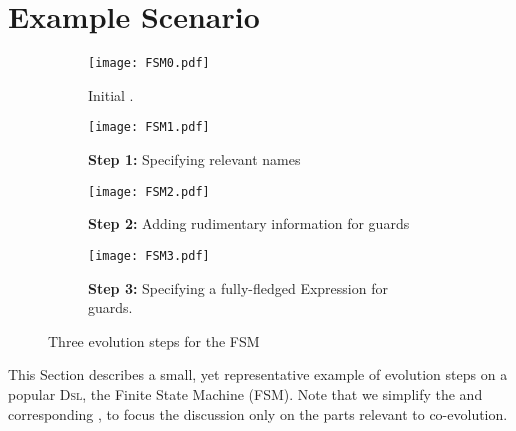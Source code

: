\section{Example Scenario}
\label{sec:Example}

\begin{figure*}
    \centering
    \begin{subfigure}[b]{0.45\textwidth}
			\centering
      \texttt{[image: FSM0.pdf]}
      \caption{Initial \metamodel.}
      \label{fig:FSM:Init}
    \end{subfigure}
    \hfill
    \begin{subfigure}[b]{0.45\textwidth}
			\centering
      \texttt{[image: FSM1.pdf]}
      \caption{\textbf{Step 1:} Specifying relevant \textsf{name}s}
      \label{fig:FSM:Relevant}
    \end{subfigure}
    \hfill
    \begin{subfigure}[b]{0.45\textwidth}
			\centering
      \texttt{[image: FSM2.pdf]}
      \caption{\textbf{Step 2:} Adding rudimentary information for guards}
      \label{fig:FSM:Guard}
    \end{subfigure}
    \hfill 
		\begin{subfigure}[b]{0.45\textwidth}
			\centering
      \texttt{[image: FSM3.pdf]}
      \caption{\textbf{Step 3:} Specifying a fully-fledged \textsf{Expression} for \textsf{guard}s.}
      \label{fig:FSM:Expression}
    \end{subfigure}
    \caption{Three evolution steps for the \textsf{FSM} \metamodel}
    \label{fig:FSM}
\end{figure*}



This Section describes a small, yet representative example of \metamodel
evolution steps on a popular \textsc{Dsl}, the Finite State Machine (\textsf{FSM}).
Note that we simplify the \metamodels and corresponding \viewtypes, to focus 
the discussion only on the parts relevant to co-evolution. 

